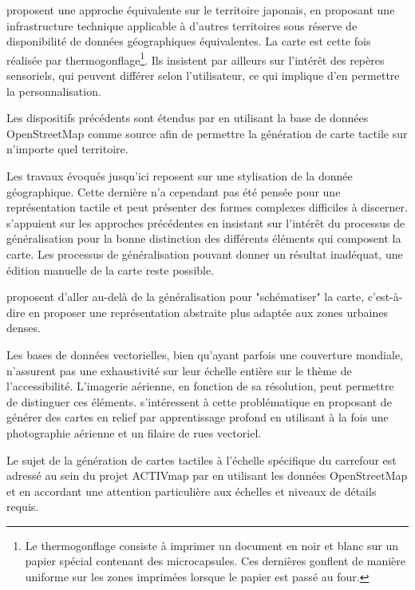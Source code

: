 \cite{Minatani2010} proposent une approche équivalente sur le territoire japonais, en proposant une infrastructure technique applicable à d'autres territoires sous réserve de disponibilité de données géographiques équivalentes. La carte est cette fois réalisée par thermogonflage\footnote{Le thermogonflage consiste à imprimer un document en noir et blanc sur un papier spécial contenant des microcapsules. Ces dernières gonflent de manière uniforme sur les zones imprimées lorsque le papier est passé au four.}. Ils insistent par ailleurs sur l'intérêt des repères sensoriels, qui peuvent différer selon l'utilisateur, ce qui implique d'en permettre la personnalisation. 

Les dispositifs précédents sont étendus par \cite{Watanabe2014, Cervenka2016} en utilisant la base de données OpenStreetMap comme source afin de permettre la génération de carte tactile sur n'importe quel territoire.

\newpar{}

Les travaux évoqués jusqu'ici reposent sur une stylisation de la donnée géographique. Cette dernière n'a cependant pas été pensée pour une représentation tactile et peut présenter des formes complexes difficiles à discerner. \cite{Stampach2016} s'appuient sur les approches précédentes en insistant sur l’intérêt du processus de généralisation pour la bonne distinction des différents éléments qui composent la carte. Les processus de généralisation pouvant donner un résultat inadéquat, une édition manuelle de la carte reste possible.

\cite{Touya2019} proposent d'aller au-delà de la généralisation pour "schématiser" la carte, c'est-à-dire en proposer une représentation abstraite plus adaptée aux zones urbaines denses. 

\newpar{}

Les bases de données vectorielles, bien qu'ayant parfois une couverture mondiale, n'assurent pas une exhaustivité sur leur échelle entière sur le thème de l'accessibilité. L'imagerie aérienne, en fonction de sa résolution, peut permettre de distinguer ces éléments. \cite{FillieresRiveau2020} s'intéressent à cette problématique en proposant de générer des cartes en relief par apprentissage profond en utilisant à la fois une photographie aérienne et un filaire de rues vectoriel. 

\newpar{}

Le sujet de la génération de cartes tactiles à l'échelle spécifique du carrefour est adressé au sein du projet ACTIVmap par \cite{Jiang2023} en utilisant les données OpenStreetMap et en accordant une attention particulière aux échelles et niveaux de détails requis.

